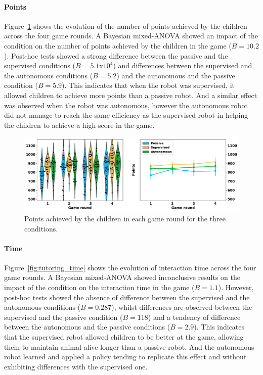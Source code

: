 \paragraph{Points}

Figure~\ref{fig:tutoring_points} shows the evolution of the number of points achieved by the children across the four game rounds. A Bayesian mixed-ANOVA showed an impact of the condition on the number of points achieved by the children in the game ($B=10.2$). Post-hoc tests showed a strong difference between the passive and the supervised conditions ($B=5.1$x$10^4$) and differences between the supervised and the autonomous conditions ($B=5.2$) and the autonomous and the passive condition ($B=5.9$). This indicates that when the robot was supervised, it allowed children to achieve more points than a  passive robot. And a similar effect was observed when the robot was autonomous, however the autonomous robot did not manage to reach the same efficiency as the supervised robot in helping the children to achieve a high score in the game.

\begin{figure}[ht]
	\includegraphics[width=1\linewidth]{points.pdf}
	\centering
	\caption{Points achieved by the children in each game round for the three conditions.}
	\label{fig:tutoring_points}
\end{figure}

\paragraph{Time}

Figure~\ref{fig:tutoring_time} shows the evolution of interaction time across the four game rounds. A Bayesian mixed-ANOVA showed inconclusive results on the impact of the condition on the interaction time in the game ($B=1.1$). However, post-hoc tests showed the absence of difference between the supervised and the autonomous conditions ($B=0.287$), whilst differences are observed between the supervised and the passive condition ($B=118$) and a tendency of difference between the autonomous and the passive conditions ($B=2.9$). This indicates that the supervised robot allowed children to be better at the game, allowing them to maintain animal alive longer than a passive robot. And the autonomous robot learned and applied a policy tending to replicate this effect and without exhibiting differences with the supervised one.

